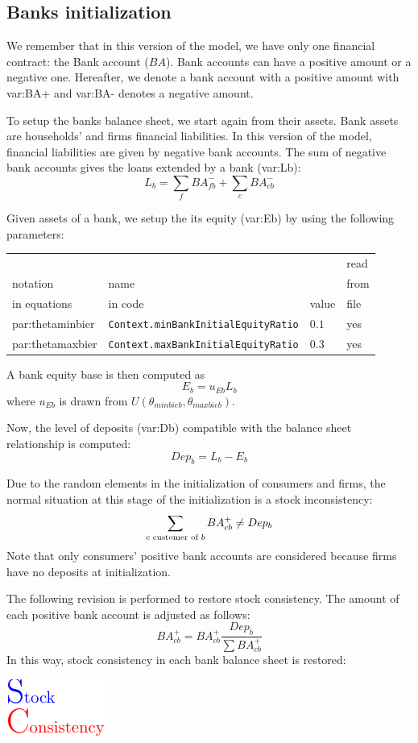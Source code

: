 \documentclass{book}
\begin{document}
\subsection{Banks initialization}
We remember that in this version of the model, we have only one financial contract: the Bank account ($BA$). Bank accounts can have a positive amount or a negative one. Hereafter, we denote a bank account with a positive amount with \gls{var:BA+} and \gls{var:BA-} denotes a negative amount.

To setup the banks balance sheet, we start again from their assets. Bank assets are households' and firms financial liabilities. In this version of the model, financial liabilities are given by negative bank accounts. 
The sum of negative bank accounts gives the loans extended by a bank (\gls{var:Lb}):
\[
	L_b=\sum_f BA_{fb}^- + \sum_c BA_{cb}^-
\]



Given assets of a bank, we setup the its equity (\gls{var:Eb}) by using the following\\
parameters:\\
\begin{tabular}{l l l l}
	\hline
	& &&read\\
	notation& name &&from\\
	in equations& in code&value&file\\
	\hline
	\hline
 \gls{par:thetaminbier}&\verb+Context.minBankInitialEquityRatio+&$0.1$&yes\\
 \gls{par:thetamaxbier}&\verb+Context.maxBankInitialEquityRatio+&$0.3$&yes\\
	\hline
\end{tabular}

\vskip5mm
A bank equity base is then computed as
\[
	E_b=u_{Eb}L_b
\]
where $u_{Eb}$ is drawn from $U(\theta_{minbieb},\theta_{maxbieb})$.

Now, the level of deposits (\gls{var:Db}) compatible with the balance sheet relationship is computed:
\[
Dep_b=L_b-E_b
\]

Due to the random elements in the initialization of consumers and firms, the normal situation at this stage of the initialization is a stock inconsistency:
\[
	\sum_{c \textnormal{ customer of } b} BA^+_{cb} \neq Dep_b
\]
Note that only consumers' positive bank accounts are considered because firms have no deposits at initialization.

The following revision is performed to restore stock consistency. The amount of each positive bank account is adjusted as follows:
\[
	BA^{+}_{cb}=BA^+_{cb}\frac{Dep_b}{\sum BA^+_{cb}}
\]
In this way, stock consistency in each bank balance sheet is restored:\begin{marginfigure}
	\hskip1cm\includegraphics[scale=1.0]{sc_logo-0.pdf}
\end{marginfigure}
\end{document}
